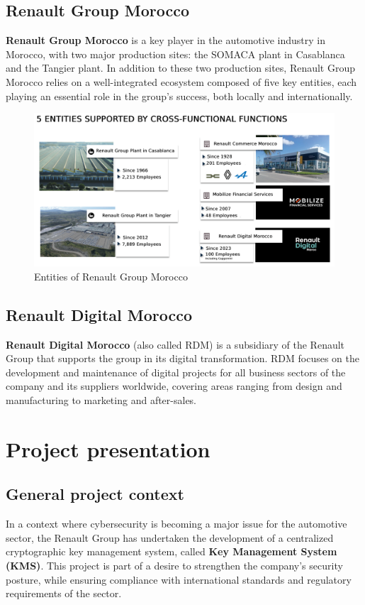 \subsection{Renault Group Morocco}
\textbf{Renault Group Morocco} is a key player in the automotive industry in Morocco, with two major production sites: the SOMACA plant in Casablanca and the Tangier plant.
In addition to these two production sites, Renault Group Morocco relies on a well-integrated ecosystem composed of five key entities, each playing an essential role in the group's success, both locally and internationally.


\begin{figure}[H]
    \centering
    \includegraphics[width=1\linewidth]{images/renault's_entities.png}
    \caption{Entities of Renault Group Morocco}
\end{figure}

\subsection{Renault Digital Morocco}
\textbf{Renault Digital Morocco} (also called RDM) is a subsidiary of the Renault Group that supports the group in its digital transformation. RDM focuses on the development and maintenance of digital projects for all business sectors of the company and its suppliers worldwide, covering areas ranging from design and manufacturing to marketing and after-sales.



\section{Project presentation}

\subsection{General project context}
In a context where cybersecurity is becoming a major issue for the automotive sector, the Renault Group has undertaken the development of a centralized cryptographic key management system, called \textbf{Key Management System (KMS)}. This project is part of a desire to strengthen the company's security posture, while ensuring compliance with international standards and regulatory requirements of the sector.

